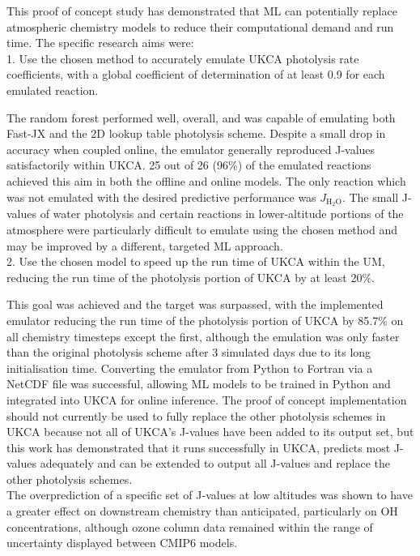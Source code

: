 \documentclass[journal abbreviation, manuscript]{copernicus}
\newcommand{\JHHO}{\ensuremath{J_{\mathrm{H_2O}}}}
\begin{document}
\conclusions  %

This proof of concept study has demonstrated that ML can potentially replace atmospheric chemistry models to reduce their computational demand and run time. 
The specific research aims were:\\

1. Use the chosen method to accurately emulate UKCA photolysis rate coefficients, with a global coefficient of determination of at least 0.9 for each emulated reaction.

The random forest performed well, overall, and was capable of emulating both Fast-JX and the 2D lookup table photolysis scheme. 
Despite a small drop in accuracy when coupled online, the emulator generally reproduced J-values satisfactorily within UKCA.
25 out of 26 (96\%) of the emulated reactions achieved this aim in both the offline and online models. The only reaction which was not emulated with the desired predictive performance was \JHHO. The small J-values of water photolysis and certain reactions in lower-altitude portions of the atmosphere were particularly difficult to emulate using the chosen method and may be improved by a different, targeted ML approach.\\

2. Use the chosen model to speed up the run time of UKCA within the UM, reducing the run time of the photolysis portion of UKCA by at least 20\%.

This goal was achieved and the target was surpassed, with the implemented emulator reducing the run time of the photolysis portion of UKCA by 85.7\% on all chemistry timesteps except the first, although the emulation was only faster than the original photolysis scheme after 3 simulated days due to its long initialisation time. Converting the emulator from Python to Fortran via a NetCDF file was successful, allowing ML models to be trained in Python and integrated into UKCA for online inference. The proof of concept implementation should not currently be used to fully replace the other photolysis schemes in UKCA because not all of UKCA's J-values have been added to its output set, but this work has demonstrated that it runs successfully in UKCA, predicts most J-values adequately and can be extended to output all J-values and replace the other photolysis schemes.\\ 

The overprediction of a specific set of J-values at low altitudes was shown to have a greater effect on downstream chemistry than anticipated, particularly on OH concentrations, although ozone column data remained within the range of uncertainty displayed between CMIP6 models.
\end{document}
